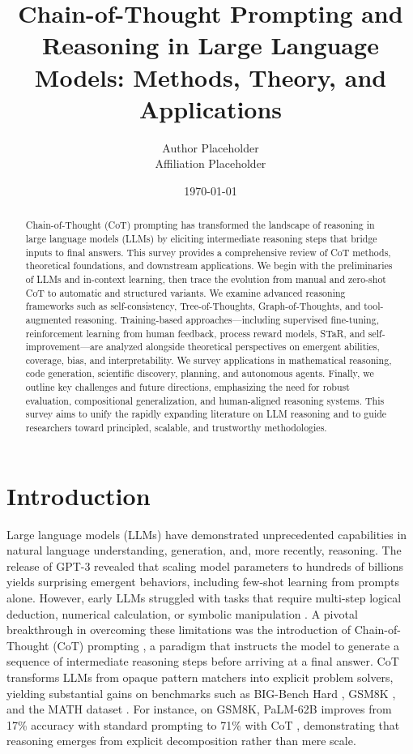 \documentclass[11pt,a4paper]{article}
\title{\textbf{Chain-of-Thought Prompting and Reasoning in Large Language Models: Methods, Theory, and Applications}}
\author{Author Placeholder\\
Affiliation Placeholder}
\date{\today}
\begin{document}
\maketitle

\begin{abstract}
Chain-of-Thought (CoT) prompting has transformed the landscape of reasoning in large language models (LLMs) by eliciting intermediate reasoning steps that bridge inputs to final answers. This survey provides a comprehensive review of CoT methods, theoretical foundations, and downstream applications. We begin with the preliminaries of LLMs and in-context learning, then trace the evolution from manual and zero-shot CoT to automatic and structured variants. We examine advanced reasoning frameworks such as self-consistency, Tree-of-Thoughts, Graph-of-Thoughts, and tool-augmented reasoning. Training-based approaches---including supervised fine-tuning, reinforcement learning from human feedback, process reward models, STaR, and self-improvement---are analyzed alongside theoretical perspectives on emergent abilities, coverage, bias, and interpretability. We survey applications in mathematical reasoning, code generation, scientific discovery, planning, and autonomous agents. Finally, we outline key challenges and future directions, emphasizing the need for robust evaluation, compositional generalization, and human-aligned reasoning systems. This survey aims to unify the rapidly expanding literature on LLM reasoning and to guide researchers toward principled, scalable, and trustworthy methodologies.
\end{abstract}

\tableofcontents

\section{Introduction}
Large language models (LLMs) have demonstrated unprecedented capabilities in natural language understanding, generation, and, more recently, reasoning. The release of GPT-3 \citep{brown2020language} revealed that scaling model parameters to hundreds of billions yields surprising emergent behaviors, including few-shot learning from prompts alone. However, early LLMs struggled with tasks that require multi-step logical deduction, numerical calculation, or symbolic manipulation \citep{suzgun2022challenging}. A pivotal breakthrough in overcoming these limitations was the introduction of Chain-of-Thought (CoT) prompting \citep{wei2022chain}, a paradigm that instructs the model to generate a sequence of intermediate reasoning steps before arriving at a final answer. CoT transforms LLMs from opaque pattern matchers into explicit problem solvers, yielding substantial gains on benchmarks such as BIG-Bench Hard \citep{suzgun2022challenging}, GSM8K \citep{cobbe2021gsm8k}, and the MATH dataset \citep{hendrycks2021measuring}. For instance, on GSM8K, PaLM-62B improves from 17\% accuracy with standard prompting to 71\% with CoT \citep{wei2022chain}, demonstrating that reasoning emerges from explicit decomposition rather than mere scale.
\end{document}
